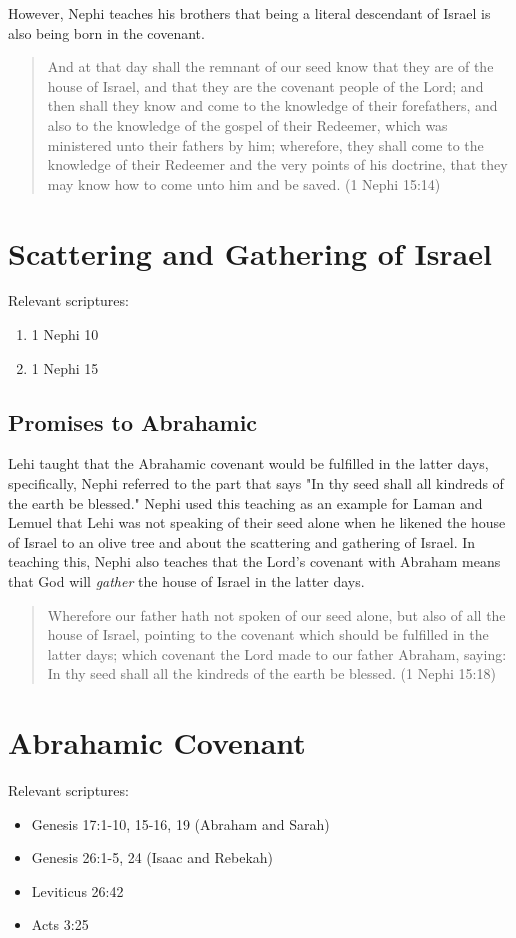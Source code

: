 However, Nephi teaches his brothers that being a literal descendant of Israel is also being born in the covenant. 

\begin{quotation}
And at that day shall the remnant of our seed know that they are of the house of Israel, and that they are the covenant people of the Lord; and then shall they know and come to the knowledge of their forefathers, and also to the knowledge of the gospel of their Redeemer, which was ministered unto their fathers by him; wherefore, they shall come to the knowledge of their Redeemer and the very points of his doctrine, that they may know how to come unto him and be saved. (1 Nephi 15:14)
\end{quotation}

\section{Scattering and Gathering of Israel}

Relevant scriptures:
\begin{enumerate}
  \item 1 Nephi 10
  \item 1 Nephi 15
\end{enumerate}

\subsection{Promises to Abrahamic}

Lehi taught that the Abrahamic covenant would be fulfilled in the latter days, specifically, Nephi referred to the part that says "In thy seed shall all kindreds of the earth be blessed." Nephi used this teaching as an example for Laman and Lemuel that Lehi was not speaking of their seed alone when he likened the house of Israel to an olive tree and about the scattering and gathering of Israel. In teaching this, Nephi also teaches that the Lord's covenant with Abraham means that God will \textit{gather} the house of Israel in the latter days.

\begin{quotation}
Wherefore our father hath not spoken of our seed alone, but also of all the house of Israel, pointing to the covenant which should be fulfilled in the latter days; which covenant the Lord made to our father Abraham, saying: In thy seed shall all the kindreds of the earth be blessed. (1 Nephi 15:18)
\end{quotation}

\section{Abrahamic Covenant}
Relevant scriptures:
\begin{itemize}
  \item Genesis 17:1-10, 15-16, 19 (Abraham and Sarah)
  \item Genesis 26:1-5, 24 (Isaac and Rebekah)
  \item Leviticus 26:42
  \item Acts 3:25
\end{itemize}
